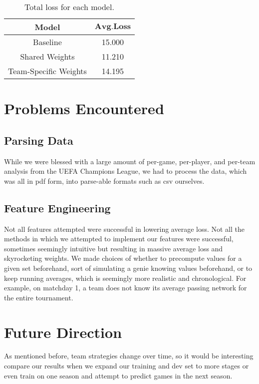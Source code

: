\documentclass[11pt,letterpaper]{article}
\begin{document}
\begin {table}
\begin{center}

\begin{tabular} {|c|c|}
\hline \bf{Model} & $\mathbf{Avg. Loss}$ \\ \hline
Baseline & 15.000 \\ \hline
Shared Weights & 11.210 \\ \hline
Team-Specific Weights & 14.195 \\ \hline
\end{tabular} 

\caption {Total loss for each model.}
\end{center}
\end {table}

\section{Problems Encountered}
\subsection{Parsing Data}
While we were blessed with a large amount of per-game, per-player, and per-team analysis from the UEFA Champions League, we had to process the data, which was all in pdf form, into parse-able formats such as csv ourselves. 

\subsection{Feature Engineering}
Not all features attempted were successful in lowering average loss. Not all the methods in which we attempted to implement our features were successful, sometimes seemingly intuitive but resulting in massive average loss and skyrocketing weights. We made choices of whether to precompute values for a given set beforehand, sort of simulating a genie knowing values beforehand, or to keep running averages, which is seemingly more realistic and chronological. For example, on matchday 1, a team does not know its average passing network for the entire tournament.

\section{Future Direction}
As mentioned before, team strategies change over time, so it would be interesting compare our results when we expand our training and dev set to more stages or even train on one season and attempt to predict games in the next season.
\end{document}
